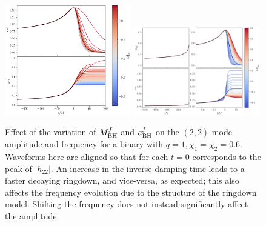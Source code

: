 \documentclass[prd,amssymb,amsmath,amsfonts,nofootinbib,reprint,showpacs,longbibliography]{revtex4-1}
\def\mbhf{M_{\rm BH}^f}
\def\abhf{a_{\rm BH}^f}
\begin{document}
\begin{figure}
    \includegraphics[width=0.49\textwidth]{figs/delta_abhf_-0.9_0.16.png}
    \includegraphics[width=0.49\textwidth]{figs/delta_Mbhf_-0.5_1.0.png}
    \caption{Effect of the variation of $\mbhf$ and $\abhf$ on the $(2,2)$ mode amplitude and frequency
    for a binary with $q = 1, \chi_1 = \chi_2 = 0.6$. Waveforms here are aligned so that for each
    $t = 0$ corresponds to the peak of $|h_{22}|$. An increase in the inverse damping time leads to a faster
    decaying ringdown, and vice-versa, as expected; this also affects the frequency evolution due to the structure of the
    ringdown model. Shifting the frequency does not instead significantly affect the amplitude.}
\end{figure}
\end{document}
